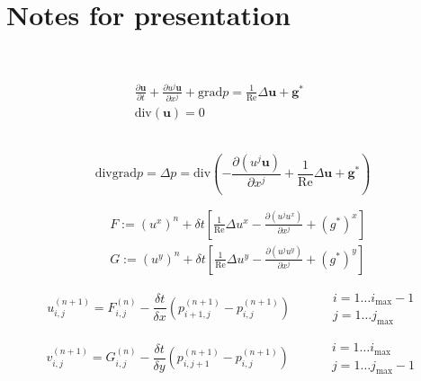 \documentclass[10pt]{amsart}
\begin{document}
\section{Notes for presentation}  

\qquad \, \\ 

\begin{Huge}
\[
	\begin{gathered}
	\frac{ \partial \mathbf{u}}{\partial t} + \frac{ \partial u^j\mathbf{u} }{ \partial x^j} + \text{grad} p = \frac{1}{\text{Re}} \Delta \mathbf{u} + \mathbf{g}^*  \qquad \,  \\
	\text{div}(\mathbf{u}) = 0 
	\end{gathered}
\]

\qquad \, \\ 

\[
\text{div}\text{grad} p = \Delta p = \text{div} \left( - \frac{ \partial (u^j \mathbf{u} )}{ \partial x^j} + \frac{1}{\text{Re} }\Delta \mathbf{u} + \mathbf{g}^* \right)
\]


\[
\begin{aligned}
& F := (u^x)^n + \delta t \left[ \frac{1}{\text{Re}}\Delta u^x - \frac{ \partial (u^ju^x)}{ \partial x^j} + (g^*)^x \right] \\
& G := (u^y)^n + \delta t \left[ \frac{1}{\text{Re}}\Delta u^y - \frac{ \partial (u^ju^y)}{ \partial x^j} + (g^*)^y \right]
\end{aligned}
\]

\[
u_{i,j}^{(n+1)} = F_{i,j}^{(n)} - \frac{ \delta t}{ \delta x }( p_{i+1,j}^{(n+1)} - p_{i,j}^{(n+1)} ) \qquad \, \begin{aligned}  & i = 1 \dots i_{\text{max}} - 1  \\
& j = 1 \dots j_{\text{max}} \end{aligned} 
\]

\[
v_{i,j}^{(n+1)} = G_{i,j}^{(n)} - \frac{ \delta t}{ \delta y }( p_{i,j+1}^{(n+1)} - p_{i,j}^{(n+1)} ) \qquad \, \begin{aligned}  & i = 1 \dots i_{\text{max}}   \\
& j = 1 \dots j_{\text{max}} -1 \end{aligned} 
\]

\end{Huge}
\end{document}
